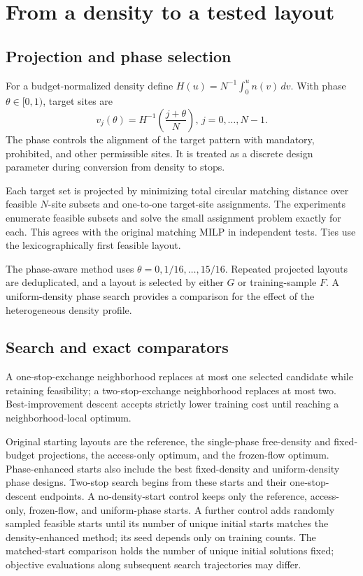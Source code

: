 \documentclass[11pt]{article}
\theoremstyle{remark}\newtheorem{remark}[theorem]{Remark}
\begin{document}
\section{From a density to a tested layout}\label{sec:algorithms}
\subsection{Projection and phase selection}
For a budget-normalized density define $H(u)=N^{-1}\int_0^u n(v)\,dv$. With phase $\theta\in[0,1)$, target sites are
\begin{equation}
v_j(\theta)=H^{-1}\left(\frac{j+\theta}{N}\right),\, j=0,\ldots,N-1.\label{eq:quantile}
\end{equation}
The phase controls the alignment of the target pattern with mandatory, prohibited, and other permissible sites. It is treated as a discrete design parameter during conversion from density to stops.

Each target set is projected by minimizing total circular matching distance over feasible $N$-site subsets and one-to-one target-site assignments. The experiments enumerate feasible subsets and solve the small assignment problem exactly for each. This agrees with the original matching MILP in independent tests. Ties use the lexicographically first feasible layout.

The phase-aware method uses $\theta=0,1/16,\ldots,15/16$. Repeated projected layouts are deduplicated, and a layout is selected by either $G$ or training-sample $F$. A uniform-density phase search provides a comparison for the effect of the heterogeneous density profile.

\subsection{Search and exact comparators}
A one-stop-exchange neighborhood replaces at most one selected candidate while retaining feasibility; a two-stop-exchange neighborhood replaces at most two. Best-improvement descent accepts strictly lower training cost until reaching a neighborhood-local optimum.

Original starting layouts are the reference, the single-phase free-density and fixed-budget projections, the access-only optimum, and the frozen-flow optimum. Phase-enhanced starts also include the best fixed-density and uniform-density phase designs. Two-stop search begins from these starts and their one-stop-descent endpoints. A no-density-start control keeps only the reference, access-only, frozen-flow, and uniform-phase starts. A further control adds randomly sampled feasible starts until its number of unique initial starts matches the density-enhanced method; its seed depends only on training counts. The matched-start comparison holds the number of unique initial solutions fixed; objective evaluations along subsequent search trajectories may differ.
\end{document}
